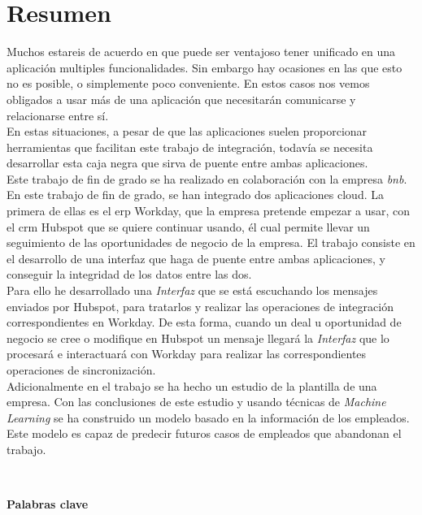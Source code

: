 \chapter*{Resumen}
	
	Muchos estareis de acuerdo en que puede ser ventajoso tener unificado en una aplicación multiples funcionalidades.
	Sin embargo hay ocasiones en las que esto no es posible, o simplemente poco conveniente.
	En estos casos nos vemos obligados a usar más de una aplicación que necesitarán comunicarse y relacionarse entre sí.\\
	
	En estas situaciones, a pesar de que las aplicaciones suelen proporcionar herramientas que facilitan este trabajo de integración, todavía se necesita desarrollar esta
	caja negra que sirva de puente entre ambas aplicaciones.\\
	
	Este trabajo de fin de grado se ha realizado en colaboración con la empresa \textit{\acrfull{bnb}}.
	En este trabajo de fin de grado, se han integrado dos aplicaciones cloud. La primera de ellas es el \acrshort{erp} Workday, que la empresa pretende empezar a usar,
	con el \acrshort{crm} Hubspot que se quiere continuar usando, él cual permite llevar un seguimiento de las oportunidades de negocio de la empresa.
	El trabajo consiste en el desarrollo de una interfaz que haga de puente entre ambas aplicaciones, 
	y conseguir la integridad de los datos entre las dos. \\
	
	
	Para ello he desarrollado una \textit{Interfaz} que se está escuchando los mensajes enviados por Hubspot, para tratarlos y realizar las operaciones de integración correspondientes en Workday.
	De esta forma, cuando un deal u oportunidad de negocio se cree o modifique en Hubspot un mensaje llegará la \textit{Interfaz} que lo procesará e interactuará
	con Workday para realizar las correspondientes operaciones de sincronización.\\
	
	
	Adicionalmente en el trabajo se ha hecho un estudio de la plantilla de una empresa.
	Con las conclusiones de este estudio y usando técnicas de \textit{Machine Learning} se ha construido
	un modelo basado en la información de los empleados. Este modelo es capaz de predecir futuros casos de empleados que abandonan el trabajo.
	

	\
	
	\textbf{Palabras clave}
    
